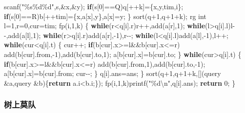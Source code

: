 \documentclass[
]{article}
\newenvironment{Shaded}{}{}
\newcommand{\CharTok}[1]{\textcolor[rgb]{0.25,0.44,0.63}{#1}}
\newcommand{\ControlFlowTok}[1]{\textcolor[rgb]{0.00,0.44,0.13}{\textbf{#1}}}
\newcommand{\DataTypeTok}[1]{\textcolor[rgb]{0.56,0.13,0.00}{#1}}
\newcommand{\DecValTok}[1]{\textcolor[rgb]{0.25,0.63,0.44}{#1}}
\newcommand{\NormalTok}[1]{#1}
\newcommand{\SpecialCharTok}[1]{\textcolor[rgb]{0.25,0.44,0.63}{#1}}
\newcommand{\StringTok}[1]{\textcolor[rgb]{0.25,0.44,0.63}{#1}}
\begin{document}
\begin{Shaded}
\begin{Highlighting}[]
\NormalTok{        scanf(}\StringTok{"}\SpecialCharTok{\%s\%d\%d}\StringTok{"}\NormalTok{,s,\&x,\&y);}
        \ControlFlowTok{if}\NormalTok{(s[}\DecValTok{0}\NormalTok{]==}\CharTok{\textquotesingle{}Q\textquotesingle{}}\NormalTok{)q[++k]=\{x,y,tim,i\};}
        \ControlFlowTok{if}\NormalTok{(s[}\DecValTok{0}\NormalTok{]==}\CharTok{\textquotesingle{}R\textquotesingle{}}\NormalTok{)b[++tim]=\{x,a[x],y\},a[x]=y;}
\NormalTok{    \}}
\NormalTok{    sort(q+}\DecValTok{1}\NormalTok{,q+}\DecValTok{1}\NormalTok{+k);}
\NormalTok{    rg }\DataTypeTok{int}\NormalTok{ l=}\DecValTok{1}\NormalTok{,r=}\DecValTok{0}\NormalTok{,cur=tim;}
\NormalTok{    fp(i,}\DecValTok{1}\NormalTok{,k)}
\NormalTok{    \{}
        \ControlFlowTok{while}\NormalTok{(r\textless{}q[i].r)r++,add(a[r],}\DecValTok{1}\NormalTok{);}
        \ControlFlowTok{while}\NormalTok{(l\textgreater{}q[i].l)l{-}{-},add(a[l],}\DecValTok{1}\NormalTok{);}
        \ControlFlowTok{while}\NormalTok{(r\textgreater{}q[i].r)add(a[r],{-}}\DecValTok{1}\NormalTok{),r{-}{-};}
        \ControlFlowTok{while}\NormalTok{(l\textless{}q[i].l)add(a[l],{-}}\DecValTok{1}\NormalTok{),l++;}
        \ControlFlowTok{while}\NormalTok{(cur\textless{}q[i].t)}
\NormalTok{        \{}
\NormalTok{            cur++;}
            \ControlFlowTok{if}\NormalTok{(b[cur].x\textgreater{}=l\&\&b[cur].x\textless{}=r)}
\NormalTok{                add(b[cur].from,{-}}\DecValTok{1}\NormalTok{),add(b[cur].to,}\DecValTok{1}\NormalTok{);}
\NormalTok{            a[b[cur].x]=b[cur].to;}
\NormalTok{        \}}
        \ControlFlowTok{while}\NormalTok{(cur\textgreater{}q[i].t)}
\NormalTok{        \{}
            \ControlFlowTok{if}\NormalTok{(b[cur].x\textgreater{}=l\&\&b[cur].x\textless{}=r)}
\NormalTok{                add(b[cur].from,}\DecValTok{1}\NormalTok{),add(b[cur].to,{-}}\DecValTok{1}\NormalTok{);}
\NormalTok{            a[b[cur].x]=b[cur].from;}
\NormalTok{            cur{-}{-};}
\NormalTok{        \}}
\NormalTok{        q[i].ans=ans;}
\NormalTok{    \}}
\NormalTok{    sort(q+}\DecValTok{1}\NormalTok{,q+}\DecValTok{1}\NormalTok{+k,[](query \&a,query \&b)\{}\ControlFlowTok{return}\NormalTok{ a.i\textless{}b.i;\});}
\NormalTok{    fp(i,}\DecValTok{1}\NormalTok{,k)printf(}\StringTok{"}\SpecialCharTok{\%d\textbackslash{}n}\StringTok{"}\NormalTok{,q[i].ans);}
    \ControlFlowTok{return} \DecValTok{0}\NormalTok{;}
\NormalTok{\}}
\end{Highlighting}
\end{Shaded}

\hypertarget{ux6811ux4e0aux83abux961f}{%
\subsubsection{树上莫队}\label{ux6811ux4e0aux83abux961f}}
\end{document}
